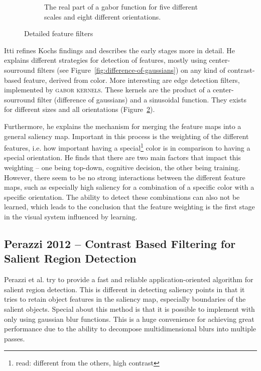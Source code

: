 \documentclass[a4paper,12pt,fleqn,oneside]{scrartcl}
\begin{document}
\begin{figure}[htb]
\begin{subfigure}[b]{0.48\textwidth}
        \caption[\url{http://opticalengineering.spiedigitallibrary.org/data/Journals/OPTICE/23430/057008_1_6.png}]{The 
        real part of a gabor function for five different scales and eight different orientations.}
        \label{fig:gabor-orientations}
    \end{subfigure}
    \caption[\url{http://opticalengineering.spiedigitallibrary.org/data/Journals/OPTICE/23430/057008_1_6.png}]{Detailed feature filters}
\end{figure}
    
Itti refines Kochs findings and describes the early stages more in detail. He explains different strategies for
detection of  features, mostly using center-sourround filters (see Figure~\ref{fig:difference-of-gaussians}) on any kind
of contrast-based feature, derived from color. More interesting are edge detection filters, implemented by \textsc{gabor
kernels}. These kernels are the product of a center-sourround filter (difference of gaussians) and a sinusoidal
function. They exists for different sizes and all orientations (Figure~\ref{fig:gabor-orientations}).

Furthermore, he explains the mechanism for merging the feature maps into a general saliency map. Important in this
process is the weighting of the different features, i.e. how important having a special\footnote{read: different from
the others, high contrast} color is in comparison to having a special orientation. He finds that there are two main
factors that impact this weighting -- one being top-down, cognitive decision, the other being training. However, there
seem to be no strong interactions between the different feature maps, such as especially high saliency for a combination
of a specific color with a specific orientation. The ability to detect these combinations can also not be learned, which
leads to the conclusion that the feature weighting is the first stage in the visual system influenced by learning.

\subsection{Perazzi 2012 -- Contrast Based Filtering for Salient Region Detection}

Perazzi et al. try to provide a fast and reliable application-oriented algorithm for salient region detection. This is
different in detecting saliency points in that it tries to retain object features in the saliency map, especially
boundaries of the salient objects. Special about this method is that it is possible to implement with only using
gaussian blur functions. This is a huge convenience for achieving great performance due to the ability to decompose
multidimensional blurs into multiple passes.
\end{document}
